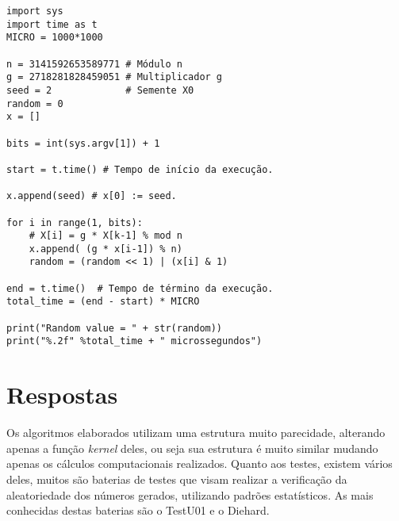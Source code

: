 \documentclass[
    article,            %
    11pt,               %
    oneside,            %
    a4paper,            %
    english,            %
    brazil,             %
    sumario=tradicional,
    ]{abntex2}
\begin{document}
\begin{lstlisting}[frame=single, title={pm.py}]
import sys
import time as t
MICRO = 1000*1000

n = 3141592653589771 # Módulo n
g = 2718281828459051 # Multiplicador g
seed = 2             # Semente X0
random = 0            
x = []                

bits = int(sys.argv[1]) + 1

start = t.time() # Tempo de início da execução.

x.append(seed) # x[0] := seed.

for i in range(1, bits):
    # X[i] = g * X[k-1] % mod n
    x.append( (g * x[i-1]) % n)
    random = (random << 1) | (x[i] & 1)

end = t.time()  # Tempo de término da execução.
total_time = (end - start) * MICRO

print("Random value = " + str(random))
print("%.2f" %total_time + " microssegundos")
\end{lstlisting}


\section*{\textbf{Respostas}}

Os algoritmos elaborados utilizam uma estrutura muito parecidade, alterando apenas a função \textit{kernel} deles, ou seja sua estrutura é muito similar mudando apenas os cálculos computacionais realizados. Quanto aos testes, existem vários deles, muitos são baterias de testes que visam realizar a verificação da aleatoriedade dos números gerados, utilizando padrões estatísticos. As mais conhecidas destas baterias são o TestU01 e o Diehard.


% 


\postextual

\nocite{bbs_random}
\nocite{lgc_random}
\nocite{pm_random}

\end{document}
